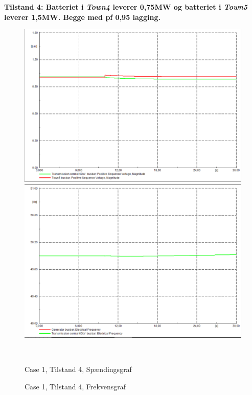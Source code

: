 \newpage
\textbf{Tilstand 4: Batteriet i \textit{Town4} leverer 0,75MW og batteriet i \textit{Town5} leverer 1,5MW. Begge med pf 0,95 lagging.}
\begin{figure}[H]
	\centering
	\begin{minipage}[b]{0.48\textwidth}
		\centering
		\includegraphics[width=1.00\textwidth]{figurer/SmallDisturbance/Voltage4} %
	\end{minipage}
	\hfill
	\begin{minipage}[b]{0.48\textwidth}
		\centering
		\includegraphics[width=1.00\textwidth]{figurer/SmallDisturbance/Freq4} %
	\end{minipage}
	\\ %
	\begin{minipage}[t]{0.48\textwidth}
		\caption{Case 1, Tilstand 4, Spændingsgraf} %
		\label{fig:C1T4V}
	\end{minipage}
	\hfill
	\begin{minipage}[t]{0.48\textwidth}
		\caption{Case 1, Tilstand 4, Frekvensgraf} %
		\label{fig:C1T4F}
	\end{minipage}
\end{figure}

